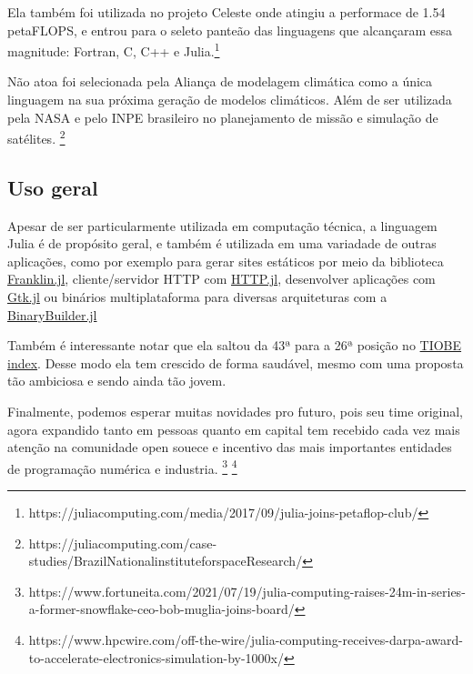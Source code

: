 Ela também foi utilizada no projeto Celeste onde atingiu a performace de 1.54 petaFLOPS, e entrou para o seleto panteão das linguagens que alcançaram essa magnitude: Fortran, C, C++ e Julia.\footnote{https://juliacomputing.com/media/2017/09/julia-joins-petaflop-club/}

Não atoa foi selecionada pela Aliança de modelagem climática como a única linguagem na sua próxima geração de modelos climáticos. Além de ser utilizada pela NASA e pelo INPE brasileiro no planejamento de missão e simulação de satélites. \footnote{https://juliacomputing.com/case-studies/BrazilNationalinstituteforspaceResearch/}



\subsection{Uso geral}

Apesar de ser particularmente utilizada em computação técnica, a linguagem Julia é de propósito geral, e também é utilizada em uma variadade de outras aplicações, como por exemplo para gerar sites estáticos por meio da biblioteca \href{http://franklinjl.org/)}{Franklin.jl}, cliente/servidor HTTP com \href{https://github.com/JuliaWeb/HTTP.jl}{HTTP.jl}, desenvolver aplicações com \href{https://github.com/JuliaGraphics/Gtk.jl}{Gtk.jl} ou binários multiplataforma para diversas arquiteturas com a \href{http://binarybuilder.org/}{BinaryBuilder.jl}

Também é interessante notar que ela saltou da 43ª para a 26ª posição no \href{https://www.tiobe.com/tiobe-index/}{TIOBE index}. 
Desse modo ela tem crescido de forma saudável, mesmo com uma proposta tão ambiciosa e sendo ainda tão jovem. 

Finalmente, podemos esperar muitas novidades pro futuro, pois seu time original, agora expandido tanto em pessoas quanto em capital tem recebido cada vez mais atenção na comunidade open souece e incentivo das mais importantes entidades de programação numérica e industria. \footnote{https://www.fortuneita.com/2021/07/19/julia-computing-raises-24m-in-series-a-former-snowflake-ceo-bob-muglia-joins-board/} \footnote{https://www.hpcwire.com/off-the-wire/julia-computing-receives-darpa-award-to-accelerate-electronics-simulation-by-1000x/}




